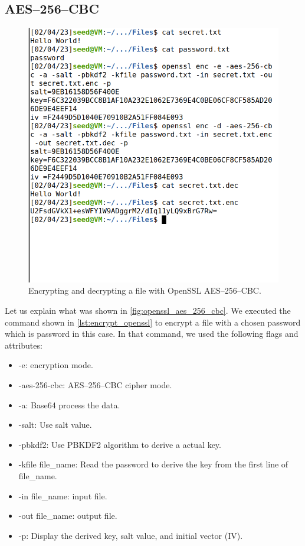 \subsection{AES--256--CBC}
%
\begin{figure}
    \centering
    \includegraphics[height=\textheight,width=\textwidth,keepaspectratio]
    {figures/aes-256-enc-dec.png}
    \caption{Encrypting and decrypting a file with OpenSSL AES--256--CBC.}
    \label{fig:openssl_aes_256_cbc}
\end{figure}

Let us explain what was shown in \autoref{fig:openssl_aes_256_cbc}. We executed
the command shown in \autoref{lst:encrypt_openssl} to encrypt a file with
a chosen password which is {\selectfont password} in this case.
In that command, we used the following flags and attributes:
\begin{itemize}
    \item {\selectfont -e}: encryption mode.
    \item {\selectfont -aes-256-cbc}: AES--256--CBC cipher mode.
    \item {\selectfont -a}: Base64 process the data.
    \item {\selectfont -salt}: Use salt value.
    \item {\selectfont -pbkdf2}: Use PBKDF2 algorithm to derive a
    actual key.
    \item {\selectfont -kfile file\_name}: Read the password to
    derive the key from the first line of {\selectfont file\_name}.
    \item {\selectfont -in file\_name}: input file.
    \item {\selectfont -out file\_name}: output file.
    \item {\selectfont -p}: Display the derived key, salt value, and
    initial vector (IV).
\end{itemize}

